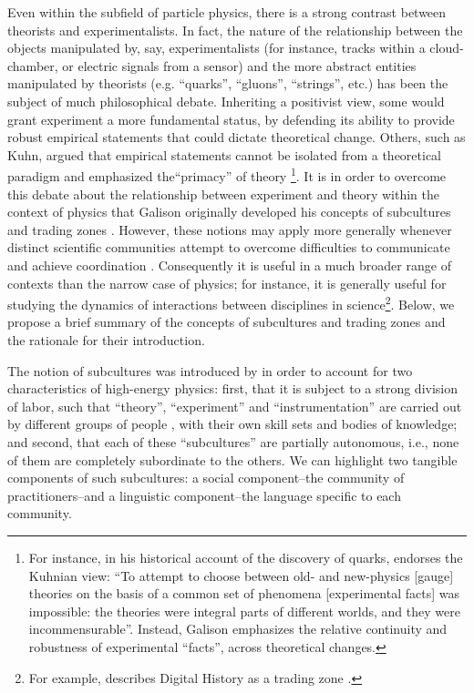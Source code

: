 \documentclass[smallextended]{svjour3}
\begin{document}
Even within the subfield of particle physics, there is a strong contrast between theorists and experimentalists. In fact, the nature of the relationship between the objects manipulated by, say, experimentalists (for instance, tracks within a cloud-chamber, or electric signals from a sensor) and the more abstract entities manipulated by theorists (e.g. ``quarks'', ``gluons'', ``strings'', etc.) has been the subject of much philosophical debate. Inheriting a positivist view, some would grant experiment a more fundamental status, by defending its ability to provide robust empirical statements that could dictate theoretical  change. Others, such as Kuhn, argued that empirical statements cannot be isolated from a theoretical paradigm and emphasized the``primacy'' of theory \citep{Galison1988}\footnote{For instance, in his historical account of the discovery of quarks, \citet[p.~411]{pickering1984constructing} endorses the Kuhnian view: ``To attempt to choose between old- and new-physics [gauge] theories on the basis of a common set of phenomena [experimental facts] was impossible: the theories were integral parts of different worlds, and they were incommensurable''. Instead, Galison emphasizes the relative continuity and robustness of experimental ``facts'', across theoretical changes.}. It is in order to overcome this debate about the relationship between experiment and theory within the context of physics that Galison originally developed his concepts of subcultures and trading zones  \citep{galison1987how,galison1997image}. However, these notions may apply more generally whenever distinct scientific communities attempt to overcome difficulties to communicate and achieve coordination \citep[p.~8]{Collins2010}. Consequently it is useful in a much broader range of contexts than the narrow case of physics; for instance, it is generally useful for studying the dynamics of interactions between disciplines in science\footnote{For example, \citet{Kemman2021} describes Digital History as a trading zone .}. Below, we propose a brief summary of the concepts of subcultures and trading zones and the rationale for their introduction.

The notion of subcultures was introduced by \citet{galison1987how,Galison1988} in order to account for two characteristics of high-energy physics: first, that it is subject to a strong division of labor, such that ``theory'', ``experiment'' and ``instrumentation'' are carried out by different groups of people \citep[p.~138]{galison1987how}, with their own skill sets and bodies of knowledge; and second, that each of these ``subcultures'' are partially autonomous, i.e., none of them are completely subordinate to the others. We can highlight two tangible components of such subcultures: a social component--the community of practitioners--and a linguistic component--the language specific to each community.
\end{document}
